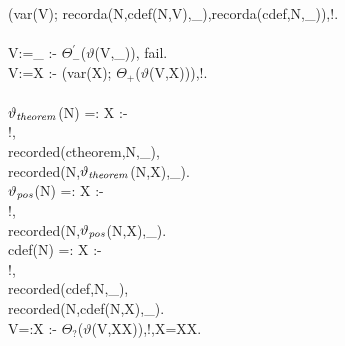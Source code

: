 \documentclass[11pt]{report}
\begin{document}
{\begin{sf}
\begin{tabbing}
\hspace{2em}(var(V); recorda(N,cdef(N,V),\_\hspace{0.1em}),recorda(cdef,N,\_\hspace{0.1em})),!.\\[-0.7ex]
\\[-0.15ex]
V:=\_\hspace{0.1em} :- $\Theta_{-}^{'}$($\vartheta$(V,\_\hspace{0.1em})), fail.\\[-0.15ex]
V:=X :- (var(X); $\Theta_+$($\vartheta$(V,X))),!.\\[-0.7ex]
\\[-0.15ex]
$\vartheta_{\it theorem}$(N) =: X :-\\[-0.15ex]
\hspace{2em}!,\\[-0.15ex]
\hspace{2em}recorded(ctheorem,N,\_\hspace{0.1em}),\\[-0.15ex]
\hspace{2em}recorded(N,$\vartheta_{\it theorem}$(N,X),\_\hspace{0.1em}).\\[-0.15ex]
$\vartheta_{\it pos}$(N) =: X :-\\[-0.15ex]
\hspace{2em}!,\\[-0.15ex]
\hspace{2em}recorded(N,$\vartheta_{\it pos}$(N,X),\_\hspace{0.1em}).\\[-0.15ex]
cdef(N) =: X :-\\[-0.15ex]
\hspace{2em}!,\\[-0.15ex]
\hspace{2em}recorded(cdef,N,\_\hspace{0.1em}),\\[-0.15ex]
\hspace{2em}recorded(N,cdef(N,X),\_\hspace{0.1em}).\\[-0.15ex]
V=:X :- $\Theta_?$($\vartheta$(V,XX)),!,X=XX.\\[-0.7ex]

\end{tabbing}\end{sf}

}
\end{document}
